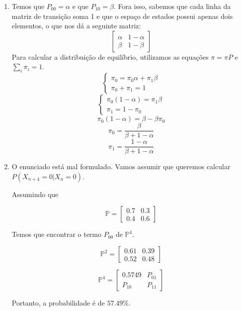 \documentclass{article}
\begin{document}
\begin{enumerate}[label=(\alph*)]

    \item Temos que $P_{00}=\alpha$ e que $P_{10}=\beta$. Fora isso, sabemos que cada linha da matriz de transição soma 1 e que o espaço de estados possui apenas dois elementos, o que nos dá a seguinte matriz:
    $$\begin{bmatrix}
        \alpha & 1-\alpha\\
        \beta & 1-\beta
    \end{bmatrix}$$
    Para calcular a distribuição de equilíbrio, utilizamos as equações $\pi=\pi P$ e $\sum_i{\pi_i}=1$.
    $$\begin{cases}
      \pi_0=\pi_0\alpha + \pi_1\beta\\
      \pi_0+\pi_1=1
    \end{cases}$$
    $$\begin{cases}
      \pi_0(1-\alpha)=\pi_1\beta\\
      \pi_1=1-\pi_0
    \end{cases}$$
    $$\pi_0(1-\alpha)=\beta-\beta\pi_0$$
    $$\pi_0=\frac{\beta}{\beta+1-\alpha}$$
    $$\pi_1=\frac{1-\alpha}{\beta+1-\alpha}$$
    
    \newpage
    
    \item O enunciado está mal formulado. Vamos assumir que queremos calcular $P(X_{n+4}=0|X_n=0)$.
    
    Assumindo que
    
    $$\mathbb{P}=\begin{bmatrix}
        0.7 & 0.3\\
        0.4 & 0.6
    \end{bmatrix}$$
    
    Temos que encontrar o termo $P_{00}$ de $\mathbb{P}^{4}$.
    
    $$\mathbb{P}^2=\begin{bmatrix}
        0.61 & 0.39\\
        0.52 & 0.48
    \end{bmatrix}$$
    
    $$\mathbb{P}^4=\begin{bmatrix}
        0.5749 & P_{01}\\
        P_{10} & P_{11}
    \end{bmatrix}$$
    
    Portanto, a probabilidade é de $57.49\%$.
    
    
    
\end{enumerate}
\end{document}
